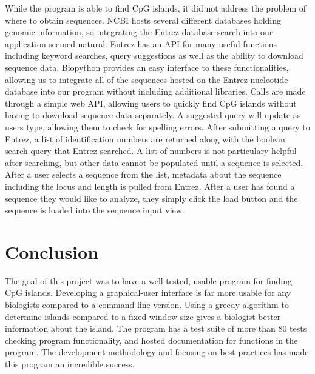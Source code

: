 \documentclass{bioinfo}
\begin{document}
While the program is able to find CpG islands, it did not address the problem of where to obtain sequences. NCBI hosts several different databases holding genomic information, so integrating the Entrez database search into our application seemed natural. Entrez has an API for many useful functions including keyword searches, query suggestions as well as the ability to download sequence data. Biopython provides an easy interface to these functionalities, allowing us to integrate all of the sequences hosted on the Entrez nucleotide database into our program without including additional libraries. Calls are made through a simple web API, allowing users to quickly find CpG islands without having to download sequence data separately. A suggested query will update as users type, allowing them to check for spelling errors. After submitting a query to Entrez, a list of identification numbers are returned along with the boolean search query that Entrez searched. A list of numbers is not particulary helpful after searching, but other data cannot be populated until a sequence is selected. After a user selects a sequence from the list, metadata about the sequence including the locus and length is pulled from Entrez. After a user has found a sequence they would like to analyze, they simply click the load button and the sequence is loaded into the sequence input view.

\section{Conclusion}
The goal of this project was to have a well-tested, usable program for finding CpG islands. Developing a graphical-user interface is far more usable for any biologists compared to a command line version. Using a greedy algorithm to determine islands compared to a fixed window size gives a biologist better information about the island. The program has a test suite of more than 80 tests checking program functionality, and hosted documentation for functions in the program. The development methodology and focusing on best practices has made this program an incredible success.

% 
% 

% 
% 
% 
% 
% 

\end{document}
